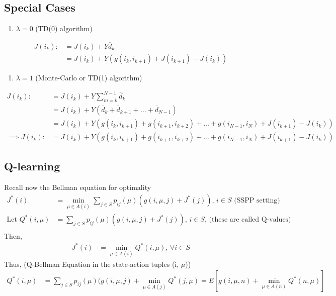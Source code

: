 \documentclass[11pt]{article}
\begin{document}
\subsection{Special Cases}
\label{sec:org8d195c0}
\begin{enumerate}
\item \(\lambda = 0\) (TD(0) algorithm)
\end{enumerate}
\begin{align*}
  J(i_k) :&= J(i_k) + Y \overline{d}_k \\
          &= J(i_k) + Y (g(i_k, i_{k+1}) + J(i_{k+1}) - J(i_k))
\end{align*}
\begin{enumerate}
\item \(\lambda = 1\) (Monte-Carlo or TD(1) algorithm)
\end{enumerate}
\begin{align*}
  J(i_k) :&= J(i_k) + Y \sum_{m=k}^{N-1}\overline{d}_k \\
          &= J(i_k) + Y (\overline{d}_k + \overline{d}_{k+1} + ... + \overline{d}_{N-1}) \\
          &= J(i_k) + Y (g(i_k, i_{k+1}) + g(i_{k+1}, i_{k+2}) + ... + g(i_{N-1}, i_N) + J(i_{k+1}) - J(i_k)) \\
\implies J(i_k) :&= J(i_k) + Y (g(i_k, i_{k+1}) + g(i_{k+1}, i_{k+2}) + ... + g(i_{N-1}, i_N) + J(i_{k+1}) - J(i_k))
\end{align*}

\subsection{Q-learning}
\label{sec:org0939c3e}
Recall now the Bellman equation for optimality
\begin{align*}
  J^{*}(i) &= \min_{\mu \in A(i)} \sum_{j \in S} p_{ij}(\mu) (g(i, \mu, j) + J^{*}(j)) \text{, $i \in S$ (SSPP setting)} \\
  \text{Let } Q^{*}(i, \mu) &= \sum_{j \in S} p_{ij}(\mu) (g(i, \mu, j) + J^{*}(j)) \text{, $i \in S$, (these are called Q-values)} \\
\end{align*}
Then,
\begin{align*}
 J^{*}(i) &= \min_{\mu \in A(i)} Q^{*}(i, \mu) \text{, $\forall i \in S$}
\end{align*}
Thus, (Q-Bellman Equation in the state-action tuples (i, \(\mu\)))
\begin{align*}
  Q^{*}(i, \mu) &= \sum_{j \in S} p_{ij}(\mu) (g(i, \mu, j) + \min_{\mu \in A(j)} Q^{*}(j, \mu)
                 = E \left[ g(i, \mu, n) + \min_{\mu \in A(n)} Q^{*}(n, \mu) \right]
\end{align*}
\end{document}

